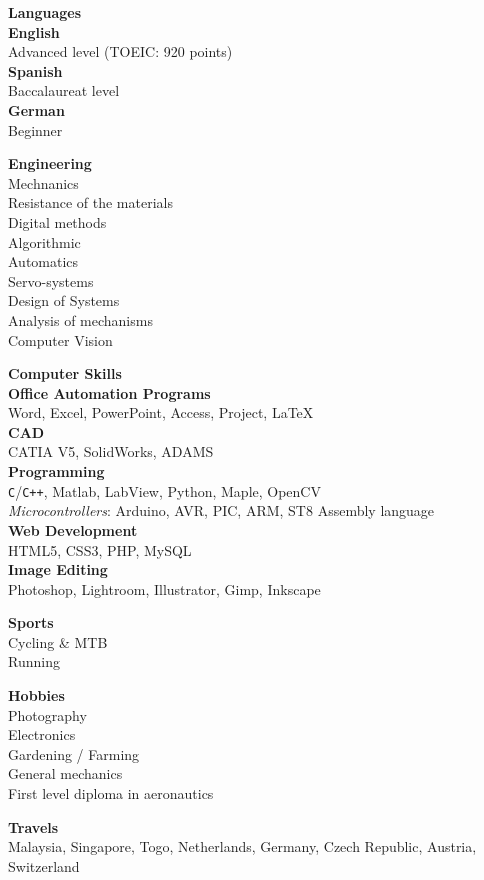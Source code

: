 \documentclass[a4paper,11pt,final]{memoir}
\newcommand{\Sep}{\vspace{1.5em}}
\newcommand{\SmallSep}{\vspace{0.5em}}
\newcommand{\SkillSection}[1]
	{\small{\textbf{#1\\}}\normalfont\footnotesize}
\newcommand{\SkillItem}[1]
	{\textbf{\color{RoyalBlue} #1}\normalfont\\}
\begin{document}
\begin{flushleft}
\SkillSection{Languages}
\SkillItem{English}
Advanced level (TOEIC: 920 points)\\
\SkillItem{Spanish}
Baccalaureat level\\
\SkillItem{German}
Beginner
\Sep

\SkillSection{Engineering}
Mechnanics\\
Resistance of the materials\\
Digital methods\\
Algorithmic\\
Automatics\\
Servo-systems\\
Design of Systems\\
Analysis of mechanisms\\
Computer Vision
\Sep

\SkillSection{Computer Skills}
\SkillItem{Office Automation Programs}
Word, Excel, PowerPoint, Access, Project, \LaTeX\\
\SkillItem{CAD}
CATIA V5, SolidWorks, ADAMS\\
\SkillItem{Programming}
\verb!C!/\verb!C++!, Matlab, LabView, Python, Maple, OpenCV\\
\emph{Microcontrollers}: Arduino, AVR, PIC, ARM, ST8 Assembly language\\
\SkillItem{Web Development}
HTML5, CSS3, PHP, MySQL\\
\SkillItem{Image Editing}
Photoshop, Lightroom, Illustrator, Gimp, Inkscape\\
\Sep

\SkillSection{Sports}
Cycling \& MTB\\
Running\\
\SmallSep

\SkillSection{Hobbies}
Photography\\
Electronics\\
Gardening / Farming\\
General mechanics\\
First level diploma in aeronautics
\SmallSep

\SkillSection{Travels}
Malaysia, Singapore, Togo, Netherlands, Germany, Czech Republic, Austria, Switzerland
\end{flushleft}
\framebreak
\end{document}

